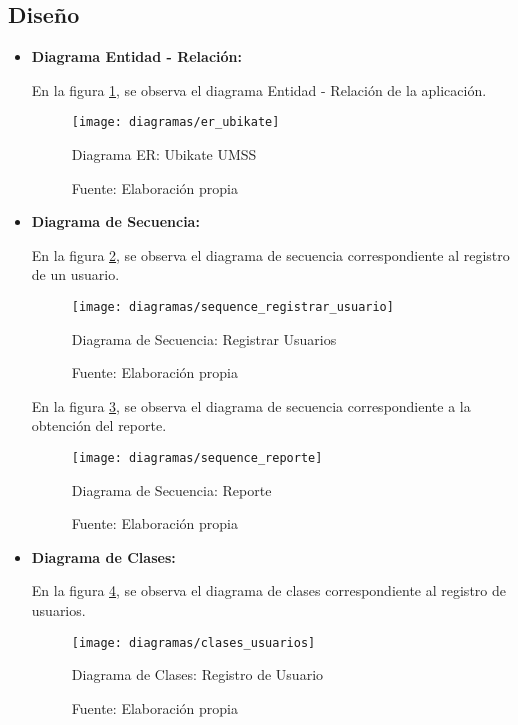 
\subsection{Diseño}


\begin{itemize}

  \item \textbf{Diagrama Entidad - Relación:}

En la figura \ref{fig:er_ubikate}, se observa el diagrama Entidad - Relación de la aplicación.


\begin{figure}[H]
  \begin{center}
    \texttt{[image: diagramas/er\_ubikate]}
  \end{center}
  \caption{Diagrama ER: Ubikate UMSS}
  \label{fig:er_ubikate}
  \caption*{Fuente: Elaboración propia}
\end{figure}


\item \textbf{Diagrama de Secuencia:}

En la figura \ref{fig:sequence_registrar_usuario}, se observa el diagrama de secuencia correspondiente al registro de un usuario.

\begin{figure}[H]
  \begin{center}
    \texttt{[image: diagramas/sequence\_registrar\_usuario]}
  \end{center}
  \caption{Diagrama de Secuencia: Registrar Usuarios}
  \label{fig:sequence_registrar_usuario}
  \caption*{Fuente: Elaboración propia}
\end{figure}

En la figura \ref{fig:sequence_reporte}, se observa el diagrama de secuencia correspondiente a la obtención del reporte.

\begin{figure}[H]
  \begin{center}
    \texttt{[image: diagramas/sequence\_reporte]}
  \end{center}
  \caption{Diagrama de Secuencia: Reporte}
  \label{fig:sequence_reporte}
  \caption*{Fuente: Elaboración propia}
\end{figure}


\item \textbf{Diagrama de Clases:}

En la figura \ref{fig:clases_usuarios}, se observa el diagrama de clases correspondiente al registro de usuarios.

\begin{figure}[H]
\begin{center}
  \texttt{[image: diagramas/clases\_usuarios]}
\end{center}
\caption{Diagrama de Clases: Registro de Usuario}
\label{fig:clases_usuarios}
\caption*{Fuente: Elaboración propia}
\end{figure}


\end{itemize}
